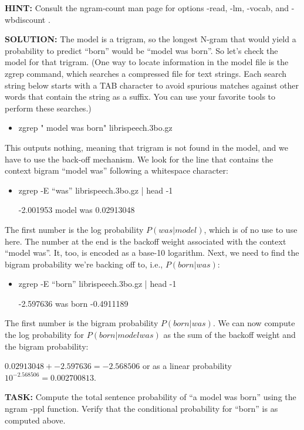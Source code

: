 {\bf HINT:}  Consult the ngram-count man page for options -read, -lm, -vocab, and -wbdiscount .

{\bf SOLUTION:} The model is a trigram, so the longest N-gram that would yield a probability to predict “born” would be “model was born”. So let’s check the model for that trigram. (One way to locate information in the model file is the zgrep command, which searches a compressed file for text strings. Each search string below starts with a TAB character to avoid spurious matches against other words that contain the string as a suffix. You can use your favorite tools to perform these searches.)
\begin{itemize}
	\item zgrep " model was born" librispeech.3bo.gz
\end{itemize}

This outputs nothing, meaning that trigram is not found in the model, and we have to use the back-off mechanism. We look for the line that contains the context bigram “model was” following a whitespace character:
\begin{itemize}
	\item zgrep -E “\smodel was” librispeech.3bo.gz | head -1

			-2.001953 model was 0.02913048
\end{itemize}

The first number is the log probability $P(was | model)$, which is of no use to use here. The number at the end is the backoff weight associated with the context “model was”. It, too, is encoded as a base-10 logarithm. Next, we need to find the bigram probability we’re backing off to, i.e., $P(born | was)$:
\begin{itemize}
	\item zgrep -E “\swas born” librispeech.3bo.gz | head -1

			-2.597636 was born -0.4911189
\end{itemize}

The first number is the bigram probability $P(born | was)$. We can now compute the log probability for $P(born | model was)$ as the sum of the backoff weight and the bigram probability:

$0.02913048 + -2.597636 = -2.568506$ or as a linear probability $10^{-2.568506} = 0.002700813$.

{\bf TASK:} Compute the total sentence probability of “a model was born” using the ngram -ppl function. Verify that the conditional probability for “born” is as computed above.

